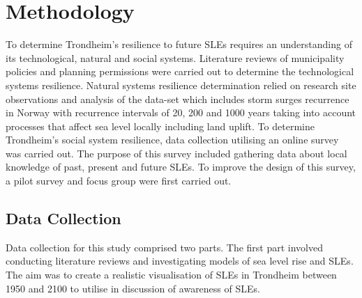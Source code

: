 
\chapter{Methodology}
To determine Trondheim's resilience to future SLEs requires an understanding of its technological, natural and social systems. Literature reviews of  municipality policies and planning permissions were carried out to determine the technological systems resilience. Natural systems resilience determination relied on research site observations and analysis of the data-set \cite{kartverket_se_2021} which includes storm surges recurrence in Norway with recurrence intervals of 20, 200 and 1000 years taking into account processes that affect sea level locally including land uplift. To determine Trondheim's social system resilience, data collection utilising an online survey was carried out. The purpose of this survey included gathering data about local knowledge of past, present and future SLEs. To improve the design of this survey, a pilot survey and focus group were first carried out.  


\section{Data Collection} \label{data-collection}

Data collection for this study comprised two parts.  The first part involved conducting literature reviews and investigating models of sea level rise and SLEs. The aim was to create a realistic visualisation of SLEs in Trondheim between 1950 and 2100 to utilise in discussion of awareness of SLEs. 
\paragraph{}

